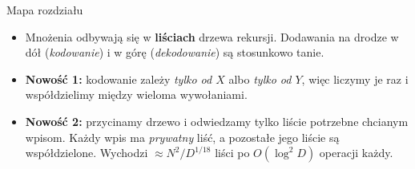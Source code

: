 \begin{frame}{Mapa rozdziału}
  \centering
  \vspace{0.6em}
  \begin{itemize}
    \item<2-> Mnożenia odbywają się w \textbf{liściach} drzewa rekursji. Dodawania na drodze w dół
      (\emph{kodowanie}) i w górę (\emph{dekodowanie}) są stosunkowo tanie.
    \item<3-> \textbf{Nowość 1:} kodowanie zależy \emph{tylko od $X$} albo \emph{tylko od $Y$},
      więc liczymy je raz i współdzielimy między wieloma wywołaniami.
    \item<4-> \textbf{Nowość 2:} przycinamy drzewo i odwiedzamy tylko liście potrzebne chcianym wpisom.
      Każdy wpis ma \emph{prywatny} liść, a pozostałe jego liście są współdzielone.
      Wychodzi $\approx N^2/D^{1/18}$ liści po $O(\log^2 D)$ operacji każdy.
  \end{itemize}
\end{frame}
